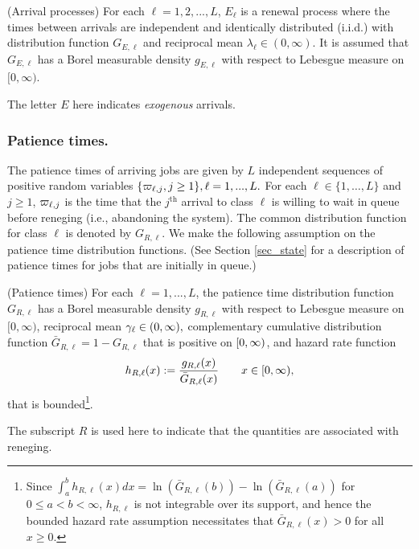 \documentclass{article}
\numberwithin{equation}{section}
\begin{document}
\begin{assumption}\label{asm_arrival}
(Arrival processes) For each $\ell=1,2,...,L$, $E_\ell$ is a renewal process where the times between arrivals are independent and identically distributed  (i.i.d.) with distribution function $G_{E,\ell}$ and reciprocal mean $\lambda_\ell\in(0,\infty)$. It is assumed that $G_{E,\ell}$ has a Borel measurable density $g_{E,\ell}$ with respect to Lebesgue measure on $[0,\infty)$.  
\end{assumption}
\noindent The letter $E$ here indicates \textit{exogenous} arrivals. 

\subsubsection*{Patience times.}
The patience times of arriving jobs are given by $L$ independent sequences of positive random variables  $\{\varpi_{\ell,j},j\geq1\}, \ell=1,...,L.$  For each $\ell \in \{ 1,\ldots, L\}$ and $j\geq 1$, 
$\varpi_{\ell, j}$ is the time that the $j^{\text{th}}$ arrival to class $\ell $ is willing to wait in queue   before reneging (i.e., abandoning the system). 
The common distribution function for class $\ell$ is denoted by $G_{R,\ell}$.  We make the following assumption on the patience time distribution functions. 
(See Section \ref{sec_state} for a description of patience times for jobs that are initially in queue.)
\begin{assumption}\label{asm_patience}
  (Patience times) For each $\ell=1,...,L$, the patience time distribution function $G_{R,\ell}$ has a Borel measurable density $g_{R,\ell}$ with respect to Lebesgue measure on $[0,\infty)$, reciprocal mean $\gamma_{\ell}\in(0,\infty),$  complementary cumulative distribution function $\bar G_{R,\ell}=1-G_{R,\ell}$ that is positive on $[0,\infty)$, and hazard rate function 
\[
h_{R,\ell}(x):=\frac{g_{R,\ell}(x)}{\bar G_{R,\ell}(x)}\quad\quad x\in[0,\infty),
\]
that is bounded\footnote{Since $\int_a^b h_{R,\ell}(x)dx = \ln(\bar G_{R,\ell}(b)) - \ln(\bar G_{R,\ell}(a))$ for $0\leq a<b <\infty$, $h_{R,\ell}$ is not integrable over its support, and hence the   bounded hazard rate assumption necessitates that $\bar G_{R,\ell}(x)>0$ for all $x\geq 0$.}.
\end{assumption}
The subscript $R$ is used here to indicate that the quantities are associated with reneging. 
\end{document}
